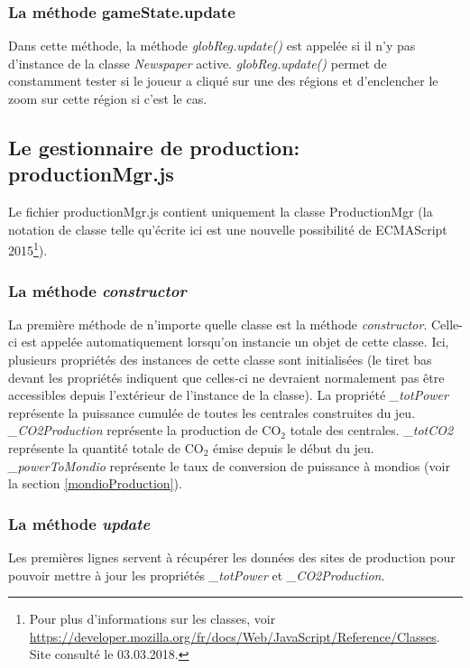 \documentclass{article}
\begin{document}
		\subsubsection{La méthode gameState.update}
		Dans cette méthode, la méthode \textit{globReg.update()} est appelée si il n'y pas d'instance de la classe \textit{Newspaper} active. \textit{globReg.update()} permet de constamment tester si le joueur a cliqué sur une des régions et d'enclencher le zoom sur cette région si c'est le cas.
		
		
		\subsection{Le gestionnaire de production: productionMgr.js} \label{productionMgr}
		
		Le fichier productionMgr.js contient uniquement la classe ProductionMgr (la notation de classe telle qu'écrite ici est une nouvelle possibilité de ECMAScript 2015\footnote{Pour plus d'informations sur les classes, voir \url{https://developer.mozilla.org/fr/docs/Web/JavaScript/Reference/Classes}. Site consulté le 03.03.2018.}).
		
		\subsubsection{La méthode \textit{constructor}}
		La première méthode de n'importe quelle classe est la méthode \textit{constructor}. Celle-ci est appelée automatiquement lorsqu'on instancie un objet de cette classe. Ici,  plusieurs propriétés des instances de cette classe sont initialisées (le tiret bas devant les propriétés indiquent que celles-ci ne devraient normalement pas être accessibles depuis l'extérieur de l'instance de la classe). La propriété \textit{\_totPower} représente la puissance cumulée de toutes les centrales construites du jeu. \textit{\_CO2Production} représente la production de CO$_{2}$ totale des centrales. \textit{\_totCO2} représente la quantité totale de CO$_{2}$ émise depuis le début du jeu. \textit{\_powerToMondio} représente le taux de conversion de puissance à mondios (voir la section \ref{mondioProduction}).
		
		\subsubsection{La méthode \textit{update}}
		Les premières lignes servent à récupérer les données des sites de production pour pouvoir mettre à jour les propriétés \textit{\_totPower} et \textit{\_CO2Production}. 
		
\end{document}
